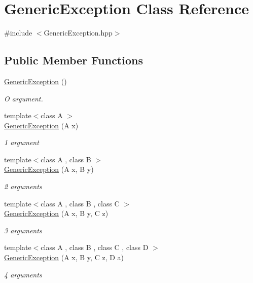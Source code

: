\hypertarget{classGenericException}{}\section{Generic\+Exception Class Reference}
\label{classGenericException}


{\ttfamily \#include $<$Generic\+Exception.\+hpp$>$}

\subsection*{Public Member Functions}
\begin{DoxyCompactItemize}
\item 
\hyperlink{classGenericException_a65f9b6d9f5f5c1e4604a1665ef4569fd}{Generic\+Exception} ()
\begin{DoxyCompactList}\small\item\em O argument. \end{DoxyCompactList}\item 
{\footnotesize template$<$class A $>$ }\\\hyperlink{classGenericException_a0f62f3365b63854f37188a7a31e7fbe1}{Generic\+Exception} (A x)
\begin{DoxyCompactList}\small\item\em 1 argument \end{DoxyCompactList}\item 
{\footnotesize template$<$class A , class B $>$ }\\\hyperlink{classGenericException_a3a2b21b1c0027f1ef551f2f5431b61da}{Generic\+Exception} (A x, B y)
\begin{DoxyCompactList}\small\item\em 2 arguments \end{DoxyCompactList}\item 
{\footnotesize template$<$class A , class B , class C $>$ }\\\hyperlink{classGenericException_ab3547c41812140b116a0df55d6a3d29d}{Generic\+Exception} (A x, B y, C z)
\begin{DoxyCompactList}\small\item\em 3 arguments \end{DoxyCompactList}\item 
{\footnotesize template$<$class A , class B , class C , class D $>$ }\\\hyperlink{classGenericException_acfd0f9b1e4fd731467ae91f56f22a8d7}{Generic\+Exception} (A x, B y, C z, D a)
\begin{DoxyCompactList}\small\item\em 4 arguments \end{DoxyCompactList}\item 

\end{DoxyCompactItemize}

